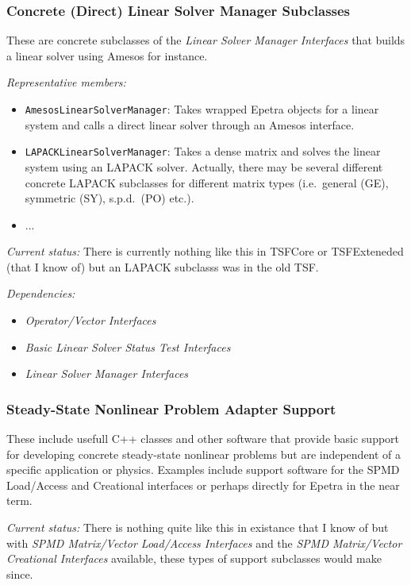 \documentclass[pdf,ps2pdf,11pt]{SANDreport}
\begin{document}
%
\subsubsection{Concrete (Direct) Linear Solver Manager Subclasses}
%

These are concrete subclasses of the {}\textit{Linear Solver Manager
Interfaces} that builds a linear solver using Amesos for instance.

{}\textit{Representative members:}
\begin{itemize}
%
{}\item {}\texttt{AmesosLinearSolverManager}: Takes wrapped Epetra objects for
a linear system and calls a direct linear solver through an Amesos interface.
%
{}\item {}\texttt{LAPACKLinearSolverManager}: Takes a dense matrix and solves
the linear system using an LAPACK solver.  Actually, there may be several
different concrete LAPACK subclasses for different matrix types (i.e.\ general
(GE), symmetric (SY), s.p.d.\ (PO) etc.).
%
{}\item ...
%
\end{itemize}

{}\textit{Current status:} There is currently nothing like this in TSFCore or
TSFExteneded (that I know of) but an LAPACK subclasss was in the old TSF.

{}\textit{Dependencies:}
\begin{itemize}
\item {}\textit{Operator/Vector Interfaces}
\item {}\textit{Basic Linear Solver Status Test Interfaces}
\item {}\textit{Linear Solver Manager Interfaces}
\end{itemize}

%
\subsubsection{Steady-State Nonlinear Problem Adapter Support}
%

These include usefull C++ classes and other software that provide basic
support for developing concrete steady-state nonlinear problems but are
independent of a specific application or physics.  Examples include support
software for the SPMD Load/Access and Creational interfaces or perhaps
directly for Epetra in the near term.

{}\textit{Current status:} There is nothing quite like this in existance that
I know of but with {}\textit{SPMD Matrix/Vector Load/Access Interfaces} and
the {}\textit{SPMD Matrix/Vector Creational Interfaces} available, these types
of support subclasses would make since.
\end{document}
